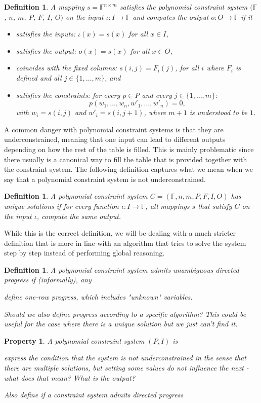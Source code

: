 \documentclass[11pt,letterpaper]{article}
\newtheorem{definition}[dummytheorem]{Definition}
\newtheorem{property}[dummytheorem]{Property}
\newcommand{\ff}{\mathbb{F}}
\begin{document}
\begin{definition}
A mapping $s = \ff^{n\times m}$ \emph{satisfies} the polynomial constraint system $(\ff$, $n$, $m$, $P$, $F$, $I$, $O)$
on the input $\iota \colon I \to \ff$ and \emph{computes the output} $o \colon O \to \ff$ if it 
\begin{itemize}
\item satisfies the inputs: $\iota(x) = s(x)$ for all $x \in I$,
\item satisfies the output: $o(x) = s(x)$ for all $x \in O$,
\item coincides with the fixed columns: $s(i, j) = F_i(j)$, for all $i$ where $F_i$ is defined and all $j \in \{1,\dots,m\}$, and 
\item satisfies the constraints: for every $p \in P$ and every $j \in \{1,\dots,m\}$:\[p(w_1,\dots,w_n,w'_1,\dots,w'_n) = 0,\]
with $w_i = s(i, j)$ and $w'_i = s(i, j + 1)$, where $m + 1$ is understood to be $1$.
\end{itemize}
\end{definition}

A common danger with polynomial constraint systems is that they are underconstrained, meaning that
one input can lead to different outputs depending on how the rest of the table is filled.
This is mainly problematic since there usually is a canonical way to fill the table that is provided together
with the constraint system. The following definition captures what we mean when we say that a polynomial
constraint system is not underconstrained.
\begin{definition}
A polynomial constraint system $C = (\ff, n, m, P, F, I, O)$ has \emph{unique solutions} if
for every function $\iota \colon I \to \ff$, all mappings $s$ that satisfy $C$ on the input $\iota$,
compute the same output.
\end{definition}

While this is the correct definition, we will be dealing with a much stricter definition
that is more in line with an algorithm that tries to solve the system step by step
instead of performing global reasoning.

\begin{definition}
A polynomial constraint system admits \emph{unambiguous directed progress} if
(informally), any 

define one-row progress, which includes "unknown" variables.

Should we also define progress according to a specific algorithm? This could be useful
for the case where there is a unique solution but we just can't find it.
\end{definition}

\begin{property}
A polynomial constraint system $(P, I)$ is \emph{}

express the condition that the system is not underconstrained in the sense that there are multiple solutions,
but setting some values do not influence the next - what does that mean? What is the output?

Also define if a constraint system admits directed progress
\end{property}
\end{document}
